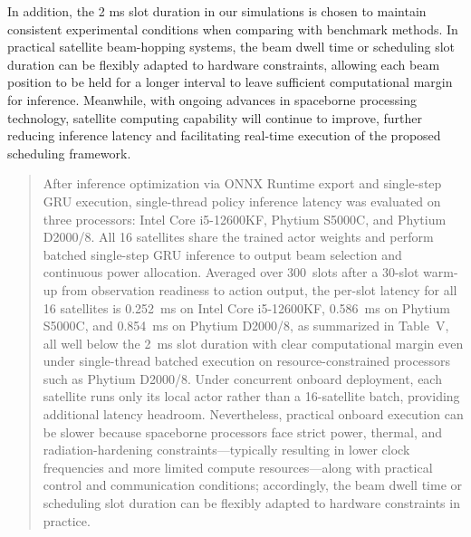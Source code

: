 \documentclass[11pt,a4paper]{article}
\begin{document}
In addition, the 2 ms slot duration in our simulations is chosen to maintain consistent experimental conditions when comparing with benchmark methods. In practical satellite beam-hopping systems, the beam dwell time or scheduling slot duration can be flexibly adapted to hardware constraints, allowing each beam position to be held for a longer interval to leave sufficient computational margin for inference. Meanwhile, with ongoing advances in spaceborne processing technology, satellite computing capability will continue to improve, further reducing inference latency and facilitating real-time execution of the proposed scheduling framework.
\par


\begin{quote}\small\color{revisionblue}
After inference optimization via ONNX Runtime export and single-step GRU execution, single-thread policy inference latency was evaluated on three processors: Intel Core i5-12600KF, Phytium S5000C, and Phytium D2000/8. All 16 satellites share the trained actor weights and perform batched single-step GRU inference to output beam selection and continuous power allocation. Averaged over 300~slots after a 30-slot warm-up from observation readiness to action output, the per-slot latency for all 16 satellites is 0.252~ms on Intel Core i5-12600KF, 0.586~ms on Phytium S5000C, and 0.854~ms on Phytium D2000/8, as summarized in Table~V, all well below the 2~ms slot duration with clear computational margin even under single-thread batched execution on resource-constrained processors such as Phytium D2000/8. Under concurrent onboard deployment, each satellite runs only its local actor rather than a 16-satellite batch, providing additional latency headroom. Nevertheless, practical onboard execution can be slower because spaceborne processors face strict power, thermal, and radiation-hardening constraints---typically resulting in lower clock frequencies and more limited compute resources---along with practical control and communication conditions; accordingly, the beam dwell time or scheduling slot duration can be flexibly adapted to hardware constraints in practice.
\par
\end{quote}

\end{document}
